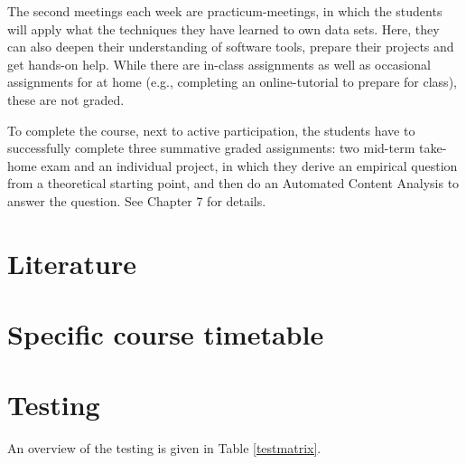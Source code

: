 \documentclass[a4paper,12pt]{report}
\begin{document}
The second meetings each week are practicum-meetings, in which the students will apply what the techniques they have learned to own data sets. Here, they can also deepen their understanding of software tools, prepare their projects and get hands-on help. While there are in-class assignments as well as occasional assignments for at home (e.g., completing an online-tutorial to prepare for class), these are not graded.


To complete the course, next to active participation, the students have to successfully complete three summative graded assignments: two mid-term take-home exam and an individual project, in which they derive an empirical question from a theoretical starting point, and then do an Automated Content Analysis to answer the question. See Chapter 7 for details.


\chapter{Literature}




\chapter{Specific course timetable}





\chapter{Testing}
An overview of the testing is given in Table \ref{testmatrix}.
\end{document}
